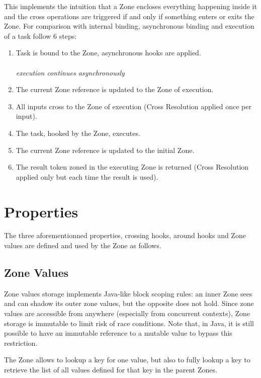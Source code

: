 This implements the intuition that a Zone encloses everything happening inside it and the cross operations are triggered if and only if something enters or exits the Zone.
For comparison with internal binding, asynchronous binding and execution of a task follow 6 steps:

\begin{enumerate}
\item Task is bound to the Zone, asynchronous hooks are applied. \\ \\
\textit{execution continues asynchronously} \\
\item The current Zone reference is updated to the Zone of execution.
\item All inputs cross to the Zone of execution (Cross Resolution applied once per input).
\item The task, hooked by the Zone, executes.
\item The current Zone reference is updated to the initial Zone.
\item The result token zoned in the executing Zone is returned (Cross Resolution applied only but each time the result is used).

\end{enumerate}

\section{Properties} %

The three aforementionned properties, crossing hooks, around hooks and Zone values are defined and used by the Zone as follows.

\subsection*{Zone Values}
Zone values storage implements Java-like block scoping rules: an inner Zone sees and can shadow its outer zone values, but the opposite does not hold. Since zone values are accessible from anywhere (especially from concurrent contexts), Zone storage is immutable to limit risk of race conditions. Note that, in Java, it is still possible to have an immutable reference to a mutable value to bypass this restriction.

The Zone allows to lookup a key for one value, but also to fully lookup a key to retrieve the list of all values defined for that key in the parent Zones.

